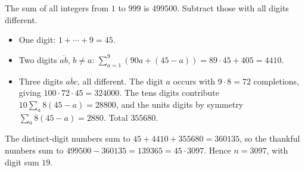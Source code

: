 The sum of all integers from $1$ to $999$ is $499500$. Subtract those with all digits different.
\begin{itemize}
\item One digit: $1+\cdots+9=45$.
\item Two digits $\overline{ab}$, $b\ne a$: $\sum_{a=1}^{9}\left(90a+(45-a)\right)=89\cdot45+405=4410$.
\item Three digits $\overline{abc}$, all different. The digit $a$ occurs with $9\cdot8=72$ completions, giving $100\cdot72\cdot45=324000$. The tens digits contribute $10\sum_{a}8(45-a)=28800$, and the units digits by symmetry $\sum_a8(45-a)=2880$. Total $355680$.
\end{itemize}
The distinct-digit numbers sum to $45+4410+355680=360135$, so the thankful numbers sum to $499500-360135=139365=45\cdot3097$. Hence $n=3097$, with digit sum $\boxed{19}$.
